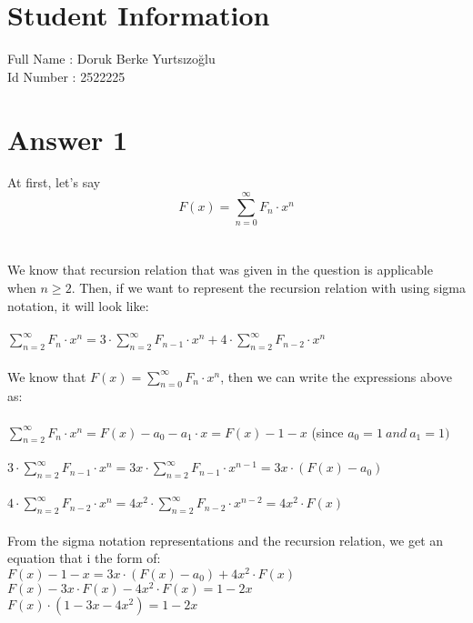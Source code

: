 \documentclass[12pt]{article}
\begin{document}
\section*{Student Information } 
Full Name : Doruk Berke Yurtsızoğlu  \\
Id Number : 2522225 \\

\section*{Answer 1}
At first, let's say $$F(x) = \sum^{\infty}_{n=0} F_n \cdot x^n$$\\
\\
We know that recursion relation that was given in the question is applicable when $n \geq 2$. Then, if we want to represent the recursion relation with using sigma notation, it will look like:\\
\\
$ \sum^{\infty}_{n=2} F_n \cdot x^n = 3 \cdot  \sum^{\infty}_{n=2} F_{n-1} \cdot x^n + 4 \cdot \sum^{\infty}_{n=2} F_{n-2} \cdot x^n$\\
\\
We know that $F(x) = \sum^{\infty}_{n=0} F_n \cdot x^n$, then we can write the expressions above as:\\
\\
$ \sum^{\infty}_{n=2} F_n \cdot x^n = F(x) - a_0 - a_1 \cdot x = F(x) -1 - x$ (since $a_0 = 1\ and\ a_1 =1)$\\
\\
$3 \cdot \sum^{\infty}_{n=2}  F_{n-1} \cdot x^n = 3x \cdot \sum^{\infty}_{n=2}  F_{n-1} \cdot x^{n-1} =  3x \cdot (F(x) - a_0)$\\
\\
$4 \cdot \sum^{\infty}_{n=2}  F_{n-2} \cdot x^n = 4x^2 \cdot \sum^{\infty}_{n=2}  F_{n-2} \cdot x^{n-2} =  4x^2 \cdot F(x)$\\
\\
From the sigma notation representations and the recursion relation, we get an equation that i the form of:\\
$F(x) -1 - x =  3x \cdot (F(x) - a_0) + 4x^2 \cdot F(x)$\\
$F(x) - 3x \cdot F(x) - 4x^2 \cdot F(x) = 1 -2x $\\
$F(x) \cdot (1 - 3x -4x^2) = 1 - 2x$\\
\\
\end{document}
